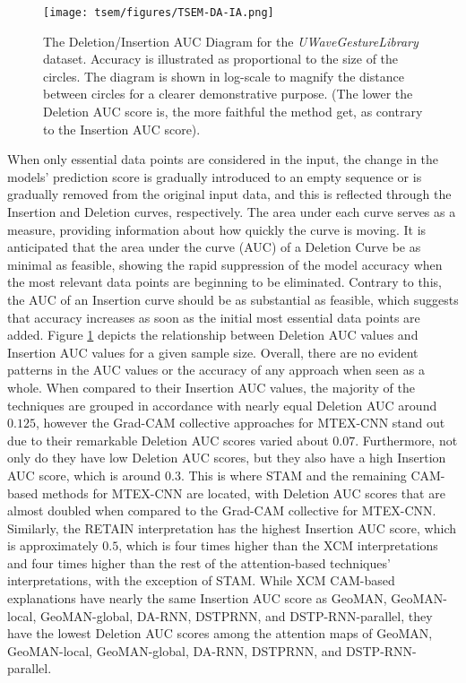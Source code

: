 \documentclass{svproc}
\begin{document}
\begin{figure}[h!]
\centering
\texttt{[image: tsem/figures/TSEM-DA-IA.png]}
\caption{The Deletion/Insertion AUC Diagram for the \textit{UWaveGestureLibrary} dataset. Accuracy is
illustrated as proportional to the size of the circles. The diagram is shown in log-scale to magnify the distance between circles for a clearer demonstrative purpose. (The lower the Deletion AUC score is, the more faithful the method get, as contrary to the Insertion AUC score).}
\label{fig:tsemdaia}
\end{figure}
When only essential data points are considered in the input, the change in the models' prediction score is gradually introduced to an empty sequence or is gradually removed from the original input data, and this is reflected through the Insertion and Deletion curves, respectively. The area under each curve serves as a measure, providing information about how quickly the curve is moving. It is anticipated that the area under the curve (AUC) of a Deletion Curve be as minimal as feasible, showing the rapid suppression of the model accuracy when the most relevant data points are beginning to be eliminated. Contrary to this, the AUC of an Insertion curve should be as substantial as feasible, which suggests that accuracy increases as soon as the initial most essential data points are added. Figure \ref{fig:tsemdaia} depicts the relationship between Deletion AUC values and Insertion AUC values for a given sample size. Overall, there are no evident patterns in the AUC values or the accuracy of any approach when seen as a whole. When compared to their Insertion AUC values, the majority of the techniques are grouped in accordance with nearly equal Deletion AUC around $0.125$, however the Grad-CAM collective approaches for MTEX-CNN stand out due to their remarkable Deletion AUC scores varied about $0.07$. Furthermore, not only do they have low Deletion AUC scores, but they also have a high Insertion AUC score, which is around $0.3$. This is where STAM and the remaining CAM-based methods for MTEX-CNN are located, with Deletion AUC scores that are almost doubled when compared to the Grad-CAM collective for MTEX-CNN. Similarly, the RETAIN interpretation has the highest Insertion AUC score, which is approximately $0.5$, which is four times higher than the XCM interpretations and four times higher than the rest of the attention-based techniques' interpretations, with the exception of STAM. While XCM CAM-based explanations have nearly the same Insertion AUC score as GeoMAN, GeoMAN-local, GeoMAN-global, DA-RNN, DSTPRNN, and DSTP-RNN-parallel, they have the lowest Deletion AUC scores among the attention maps of GeoMAN, GeoMAN-local, GeoMAN-global, DA-RNN, DSTPRNN, and DSTP-RNN-parallel. 
\end{document}
